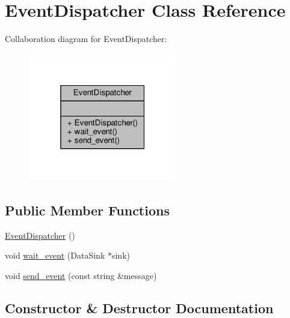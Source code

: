 \hypertarget{classEventDispatcher}{}\section{Event\+Dispatcher Class Reference}
\label{classEventDispatcher}


Collaboration diagram for Event\+Dispatcher\+:\nopagebreak
\begin{figure}[H]
\begin{center}
\leavevmode
\includegraphics[width=184pt]{classEventDispatcher__coll__graph}
\end{center}
\end{figure}
\subsection*{Public Member Functions}
\begin{DoxyCompactItemize}
\item 
\hyperlink{classEventDispatcher_aec174a9e25796e5727e59f5452817cda}{Event\+Dispatcher} ()
\item 
void \hyperlink{classEventDispatcher_af52dcf785f0c33b88c5b96bb91c6610c}{wait\+\_\+event} (Data\+Sink $\ast$sink)
\item 
void \hyperlink{classEventDispatcher_a17ee873402eb3abbb1e3cd5fa1fadafc}{send\+\_\+event} (const string \&message)
\end{DoxyCompactItemize}


\subsection{Constructor \& Destructor Documentation}
\mbox{\label{classEventDispatcher_aec174a9e25796e5727e59f5452817cda}} 
